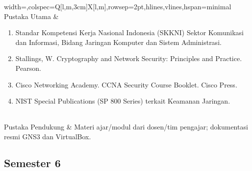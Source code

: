 \begin{longtblr}{width=\textwidth,colspec={Q[l,m,3cm]X[l,m]},rowsep=2pt,hlines,vlines,hspan=minimal}
Pustaka Utama & \begin{enumerate}\item Standar Kompetensi Kerja Nasional Indonesia (SKKNI) Sektor Komunikasi dan Informasi, Bidang Jaringan Komputer dan Sistem Administrasi.\item Stallings, W. Cryptography and Network Security: Principles and Practice. Pearson.\item Cisco Networking Academy. CCNA Security Course Booklet. Cisco Press.\item NIST Special Publications (SP 800 Series) terkait Keamanan Jaringan.\end{enumerate} \\
Pustaka Pendukung &  Materi ajar/modul dari dosen/tim pengajar; dokumentasi resmi GNS3 dan VirtualBox. \\
\end{longtblr}

\subsection*{Semester 6}

